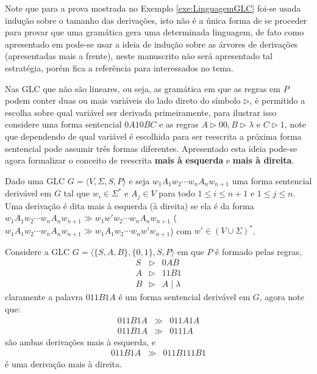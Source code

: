 Note que para a prova mostrada no Exemplo \ref{exe:LinguagemGLC} foi-se usada indução sobre o tamanho das derivações, isto não é a única forma de se proceder para provar que uma gramática gera uma determinada linguagem, de  fato como apresentado em \cite{hopcroft2008} pode-se usar a ideia de indução sobre as árvores de derivações (apresentadas mais a frente), neste manuscrito não será apresentado tal estratégia, porém fica a referência para interessados no tema. 

Nas GLC que não são lineares, ou seja, as gramática em que as regras em $P$ podem conter duas ou mais variáveis do lado direto do símbolo $\rhd$, é permitido a escolha sobre qual variável ser derivada primeiramente, para ilustrar isso considere uma forma sentencial $0A10BC$ e as regras $A \rhd 00, B \rhd \lambda$ e $C \rhd 1$, note que dependendo de qual variável é escolhida para ser reescrita a próxima forma sentencial pode assumir três formas diferentes. Apresentado esta ideia pode-se agora formalizar o conceito de reescrita \textbf{mais à esquerda} e \textbf{mais à direita}.

\begin{definition}\label{def:TiposLateraisReescrita}
	Dado uma GLC $G = \langle V, \Sigma, S, P\rangle$ e seja $w_1A_1w_2\cdots w_nA_nw_{n+1}$ uma forma sentencial derivável em $G$ tal que $w_i \in \Sigma^*$ e $A_j \in V$ para todo $1 \leq i \leq n+1$ e $1 \leq j \leq n$. Uma derivação é dita mais à esquerda (à direita) se ela é da forma $w_1A_1w_2\cdots w_nA_nw_{n+1} \gg w_1w'w_2\cdots w_nA_nw_{n+1}$ ($w_1A_1w_2\cdots w_nA_nw_{n+1} \gg w_1A_1w_2\cdots w_nw'w_{n+1}$)  com  $w' \in (V \cup \Sigma)^*$.
\end{definition}

\begin{example}\label{exe:ReescritasLaterais}
	Considere a GLC $G = \langle \{S, A, B\}, \{0, 1\}, S, P\rangle$ em que $P$ é formado pelas regras,
	\begin{eqnarray*}
		S & \rhd & 0AB\\
		A & \rhd & 11B1 \\
		B & \rhd & A \mid \lambda 
	\end{eqnarray*}
	claramente a palavra $011B1A$ é um forma sentencial derivável em $G$, agora note que:
	\begin{eqnarray*}
		011B1A & \gg & 011A1A\\
		011B1A & \gg & 0111A
	\end{eqnarray*}
	são ambas derivações mais à esquerda, e 
	\begin{eqnarray*}
		011B1A & \gg & 011B111B1
	\end{eqnarray*}
	é uma derivação mais à direita.
\end{example}

